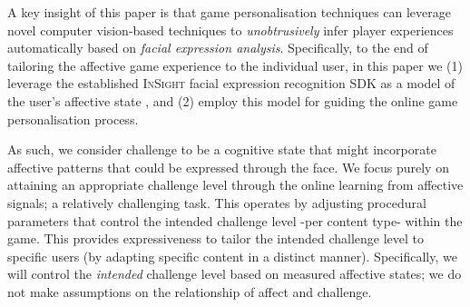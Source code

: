 \documentclass[letterpaper]{article}
\begin{document}
A key insight of this paper is that game personalisation techniques can leverage novel computer vision-based techniques to \emph{unobtrusively} infer player experiences automatically based on \emph{facial expression analysis}. Specifically, to the end of tailoring the affective game experience to the individual user, in this paper we (1) leverage the established \textsc{InSight} facial expression recognition SDK as a model of the user's affective state \cite{InSight}, and (2) employ this model for guiding the online game personalisation process.

As such, we consider challenge to be a cognitive state that might incorporate affective patterns that could be expressed through the face. We focus purely on attaining an appropriate challenge level through the online learning from affective signals; a relatively challenging task. This operates by adjusting procedural parameters that control the intended challenge level -per content type- within the game. This provides expressiveness to tailor the intended challenge level to specific users (by adapting specific content in a distinct manner). Specifically, we will control the \emph{intended} challenge level based on measured affective states; we do not make assumptions on the relationship of affect and challenge.
\end{document}
